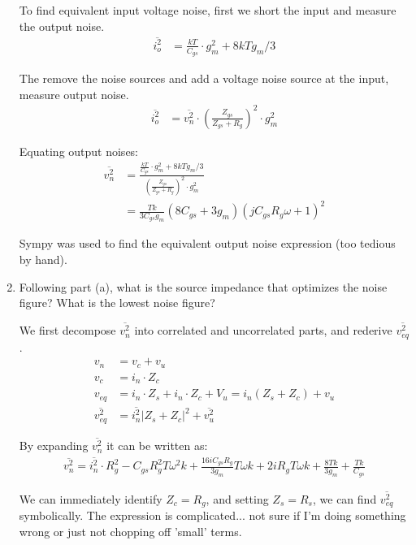 \begin{enumerate}[label=(\alph*)]
    To find equivalent input voltage noise, first we short the input and measure the output noise.
    \begin{align*}
        \overline{i_{o}^2} &= \frac{kT}{C_{gs}} \cdot g_m^2 + 8kT g_m / 3
    \end{align*}

    The remove the noise sources and add a voltage noise source at the input, measure output noise.
    \begin{align*}
        \overline{i_o^2} &= \overline{v_n^2} \cdot (\frac{Z_{gs}}{Z_{gs} + R_g})^2 \cdot g_m^2
    \end{align*}

    Equating output noises:
    \begin{align*}
        \overline{v_n^2} &= \frac{\frac{kT}{C_{gs}} \cdot g_m^2 + 8kT g_m / 3}{(\frac{Z_{gs}}{Z_{gs} + R_g})^2 \cdot g_m^2} \\
        &= \frac{T k}{3 C_{gs} g_{m}} \left(8 C_{gs} + 3 g_{m}\right) \left(j C_{gs} R_{g} \omega + 1\right)^{2}
    \end{align*}

    Sympy was used to find the equivalent output noise expression (too tedious by hand).

    \item {\color{blue} Following part (a), what is the source impedance that optimizes the noise figure? What is the lowest noise figure?}

    We first decompose $\overline{v_n^2}$ into correlated and uncorrelated parts, and rederive $\overline{v_{eq}^2}$.
    \begin{align*}
        v_n &= v_c + v_u \\
        v_c &= i_n \cdot Z_c \\
        v_{eq} &= i_n \cdot Z_s + i_n \cdot Z_c + V_u = i_n(Z_s + Z_c) + v_u \\
        \overline{v_{eq}^2} &= \overline{i_n^2} |Z_s + Z_c|^2 + \overline{v_u^2}
    \end{align*}

    By expanding $\overline{v_n^2}$ it can be written as:
    \begin{align*}
        \overline{v_n^2} = \overline{i_n^2} \cdot R_{g}^{2} - C_{gs} R_{g}^{2} T \omega^{2} k + \frac{16 i C_{gs} R_{g}}{3 g_{m}} T \omega k + 2 i R_{g} T \omega k + \frac{8 T k}{3 g_{m}} + \frac{T k}{C_{gs}}
    \end{align*}

    We can immediately identify $Z_c = R_g$, and setting $Z_s = R_s$, we can find $\overline{v_{eq}^2}$ symbolically.
    The expression is complicated... not sure if I'm doing something wrong or just not chopping off 'small' terms.


\end{enumerate}
